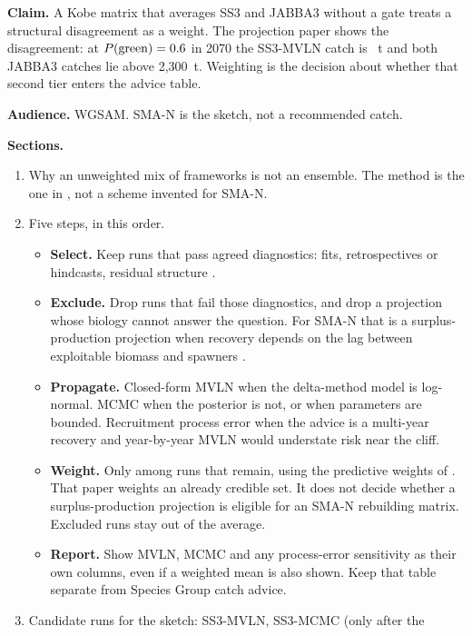 \documentclass[11pt,a4paper]{article}
\begin{document}
\textbf{Claim.} A Kobe matrix that averages SS3 and JABBA3 without a gate
treats a structural disagreement as a weight. The projection paper shows the
disagreement: at $P(\mathrm{green}) = 0.6$ in 2070 the SS3-MVLN catch is
\tacMvlnSeventySixty~t and both JABBA3 catches lie above 2{,}300~t. Weighting
is the decision about whether that second tier enters the advice table.

\textbf{Audience.} WGSAM. SMA-N is the sketch, not a recommended catch.

\textbf{Sections.}
\begin{enumerate}[leftmargin=*]
  \item Why an unweighted mix of frameworks is not an ensemble. The method
    is the one in \citet{WangEnsembleR5}, not a scheme invented for SMA-N.
  \item Five steps, in this order.
    \begin{itemize}[leftmargin=*]
      \item \textbf{Select.} Keep runs that pass agreed diagnostics: fits,
        retrospectives or hindcasts, residual structure
        \citep{Kell2026Diags,Carvalho2021}.
      \item \textbf{Exclude.} Drop runs that fail those diagnostics, and drop
        a projection whose biology cannot answer the question. For SMA-N that
        is a surplus-production projection when recovery depends on the lag
        between exploitable biomass and spawners \citep{Winker2020SMA}.
      \item \textbf{Propagate.} Closed-form MVLN when the delta-method model
        is log-normal. MCMC when the posterior is not, or when parameters are
        bounded. Recruitment process error when the advice is a multi-year
        recovery and year-by-year MVLN would understate risk near the cliff.
      \item \textbf{Weight.} Only among runs that remain, using the predictive
        weights of \citet{WangEnsembleR5}. That paper weights an already
        credible set. It does not decide whether a surplus-production
        projection is eligible for an SMA-N rebuilding matrix. Excluded runs
        stay out of the average.
      \item \textbf{Report.} Show MVLN, MCMC and any process-error sensitivity
        as their own columns, even if a weighted mean is also shown. Keep that
        table separate from Species Group catch advice.
    \end{itemize}
  \item Candidate runs for the sketch: SS3-MVLN, SS3-MCMC (only after the

\end{enumerate}
\end{document}
